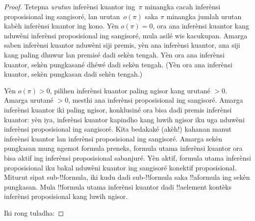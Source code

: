 \documentclass[../../../include/open-logic-section]{subfiles}
\begin{document}
\begin{proof}
  Tetepna \emph{urutan} inferènsi kuantor ing~$\pi$
  minangka cacah inferènsi proposisional ing sangisoré,
  lan urutan~$o(\pi)$ saka $\pi$ minangka jumlah
  urutan kabèh inferènsi kuantor ing kono.
  Yèn $o(\pi) = 0$, ora ana inferènsi kuantor kang
  nduwèni inferènsi proposisional ing sangisoré,
  mula asilé wis kacukupan. Amarga saben inferènsi
  kuantor nduwèni siji premis, yèn ana inferènsi
  kuantor, ana siji kang paling dhuwur lan premisé
  dadi sekèn tengah. Yèn ora ana inferènsi kuantor,
  sekèn pungkasané dhéwé dadi sekèn tengah.
(Yèn ora ana inferènsi kuantor, sekèn pungkasan dadi sekèn tengah.)

  Yèn $o(\pi) > 0$, pilihen inferènsi kuantor paling
  ngisor kang urutané $>0$. Amarga urutané $>0$,
  mesthi ana inferènsi proposisional ing sangisoré.
  Amarga inferènsi kuantor iki paling ngisor,
  konklusiné ora bisa dadi premis inferènsi kuantor:
  yèn iya, inferènsi kuantor kapindho kang luwih
  ngisor iku uga nduwèni inferènsi proposisional ing
  sangisoré. Kita bedakaké (akèh!) kahanan manut
  inferènsi kuantor lan inferènsi proposisional ing
  sangisoré. Amarga sekèn pungkasan mung ngemot
  formula preneks, formula utama inferènsi kuantor
  ora bisa aktif ing inferènsi proposisional sabanjuré.
  Yèn aktif, formula utama inferènsi proposisional iku
  bakal nduwèni kuantor ing sangisoré konektif
  proposisional. Miturut sipat sub-!!{formula},
  iki kudu dadi sub-!!{formula} saka !!a{formula}
  ing sekèn pungkasan. Mula !!{formula} utama
  inferènsi kuantor dadi !!a{element} kontèks inferènsi
  proposisional kang luwih ngisor.

  Iki rong tuladha:


\end{proof}
\end{document}
